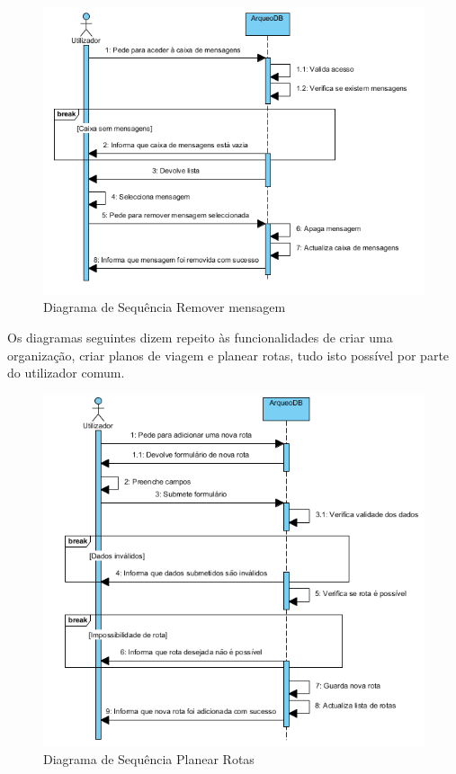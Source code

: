 \documentclass[12pt,a4paper]{article}
\begin{document}
\begin{figure}[h!]
\centering
\includegraphics[scale=0.8]{sequencia/apagarmensagem}
\caption{Diagrama de Sequência Remover mensagem} 
\end{figure}

\clearpage
Os diagramas seguintes dizem repeito às funcionalidades de criar uma organização, criar planos de viagem e planear rotas, tudo isto possível por parte do utilizador comum.\\

\begin{figure}[h!]
\centering
\includegraphics[scale=1]{sequencia/planearrotas}
\caption{Diagrama de Sequência Planear Rotas} 
\end{figure}
\end{document}
